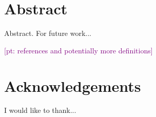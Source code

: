 \documentclass[11pt, twoside, openright]{report} %
\newcommand{\pt}[1]{\textcolor{Purple}{[pt: #1]}}
\begin{document}


\chapter*{Abstract}
Abstract. %
For future work... 

\pt{references and potentially more definitions}

\chapter*{Acknowledgements}

I would like to thank...

\tableofcontents
\end{document}
